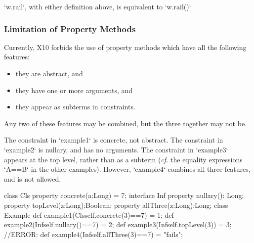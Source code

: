 \xcd`w.rail`, with either definition above, 
is equivalent to 
\xcd`w.rail()`


\subsubsection{Limitation of Property Methods}

\limitationx{} 
Currently, X10 forbids the use of property methods which have all the
following features: 
\begin{itemize}
\item they are abstract, and
\item they have one or more arguments, and
\item they appear as subterms in constraints.
\end{itemize}
Any two of these features may be combined, but the three together may not be. 

\begin{ex} 
The constraint in \xcd`example1` is concrete, not abstract.  The constraint in
\xcd`example2` is nullary, and has no arguments.  The constraint in
\xcd`example3` appears at the top level, rather than as a subterm ({\em cf.}
the equality expressions \xcd`A==B` in the other examples).    However,
\xcd`example4` combines all three features, and is not allowed.
\begin{xten}
class Cls {
  property concrete(a:Long) = 7;
}
interface Inf {
  property nullary(): Long;
  property topLevel(z:Long):Boolean;
  property allThree(z:Long):Long;
}
class Example{
  def example1(Cls{self.concrete(3)==7}) = 1;
  def example2(Inf{self.nullary()==7})   = 2;
  def example3(Inf{self.topLevel(3)})    = 3;
  //ERROR: def example4(Inf{self.allThree(3)==7}) = "fails";
}
\end{xten}
%
\end{ex}


